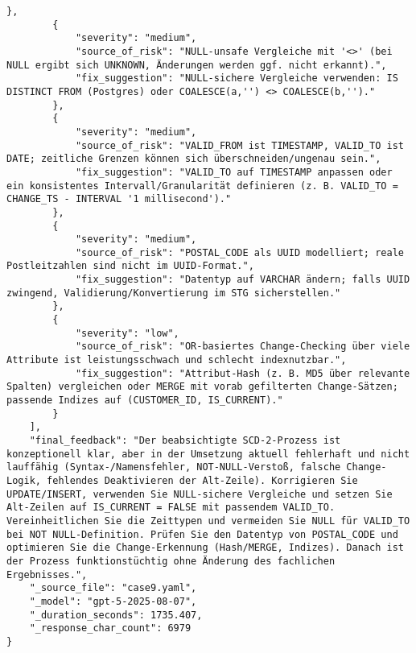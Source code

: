 \begin{lstlisting}[caption={Ausgabe: GPT-5 Anwendungsfall 9 Konsistenzdurchlauf},label={gpt_case9_prompt2}]
        },
        {
            "severity": "medium",
            "source_of_risk": "NULL-unsafe Vergleiche mit '<>' (bei NULL ergibt sich UNKNOWN, Änderungen werden ggf. nicht erkannt).",
            "fix_suggestion": "NULL-sichere Vergleiche verwenden: IS DISTINCT FROM (Postgres) oder COALESCE(a,'') <> COALESCE(b,'')."
        },
        {
            "severity": "medium",
            "source_of_risk": "VALID_FROM ist TIMESTAMP, VALID_TO ist DATE; zeitliche Grenzen können sich überschneiden/ungenau sein.",
            "fix_suggestion": "VALID_TO auf TIMESTAMP anpassen oder ein konsistentes Intervall/Granularität definieren (z. B. VALID_TO = CHANGE_TS - INTERVAL '1 millisecond')."
        },
        {
            "severity": "medium",
            "source_of_risk": "POSTAL_CODE als UUID modelliert; reale Postleitzahlen sind nicht im UUID-Format.",
            "fix_suggestion": "Datentyp auf VARCHAR ändern; falls UUID zwingend, Validierung/Konvertierung im STG sicherstellen."
        },
        {
            "severity": "low",
            "source_of_risk": "OR-basiertes Change-Checking über viele Attribute ist leistungsschwach und schlecht indexnutzbar.",
            "fix_suggestion": "Attribut-Hash (z. B. MD5 über relevante Spalten) vergleichen oder MERGE mit vorab gefilterten Change-Sätzen; passende Indizes auf (CUSTOMER_ID, IS_CURRENT)."
        }
    ],
    "final_feedback": "Der beabsichtigte SCD-2-Prozess ist konzeptionell klar, aber in der Umsetzung aktuell fehlerhaft und nicht lauffähig (Syntax-/Namensfehler, NOT-NULL-Verstoß, falsche Change-Logik, fehlendes Deaktivieren der Alt-Zeile). Korrigieren Sie UPDATE/INSERT, verwenden Sie NULL-sichere Vergleiche und setzen Sie Alt-Zeilen auf IS_CURRENT = FALSE mit passendem VALID_TO. Vereinheitlichen Sie die Zeittypen und vermeiden Sie NULL für VALID_TO bei NOT NULL-Definition. Prüfen Sie den Datentyp von POSTAL_CODE und optimieren Sie die Change-Erkennung (Hash/MERGE, Indizes). Danach ist der Prozess funktionstüchtig ohne Änderung des fachlichen Ergebnisses.",
    "_source_file": "case9.yaml",
    "_model": "gpt-5-2025-08-07",
    "_duration_seconds": 1735.407,
    "_response_char_count": 6979
}
\end{lstlisting}

